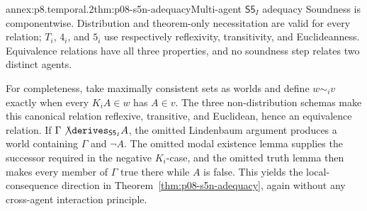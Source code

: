 \begin{annexitem}{annex:p8.temporal.2}{thm:p08-s5n-adequacy}{Multi-agent \(\mathsf{S5}_{I}\) adequacy}
Soundness is componentwise.  Distribution and theorem-only necessitation are
valid for every relation; \(T_i\), \(4_i\), and \(5_i\) use respectively
reflexivity, transitivity, and Euclideanness.  Equivalence relations have all
three properties, and no soundness step relates two distinct agents.

For completeness, take maximally consistent sets as worlds and define
\(w\sim_i v\) exactly when every \(K_iA\in w\) has \(A\in v\).  The three
non-distribution schemas make this canonical relation reflexive, transitive,
and Euclidean, hence an equivalence relation.  If
\(\Gamma\not\derives_{\mathsf{S5}_{I}}A\), the omitted Lindenbaum argument
produces a world containing \(\Gamma\) and \(\neg A\).  The omitted modal
existence lemma supplies the successor required in the negative \(K_i\)-case,
and the omitted truth lemma then makes every member of \(\Gamma\) true there
while \(A\) is false.  This yields the local-consequence direction in
Theorem~\ref{thm:p08-s5n-adequacy}, again without any cross-agent interaction
principle.
\end{annexitem}
